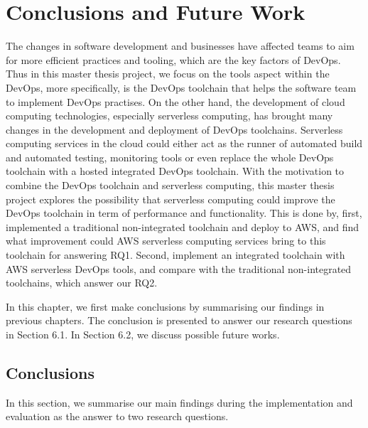 \chapter{Conclusions and Future Work}
\label{chp:conclusionsandfuturework}
The changes in software development and businesses have affected teams to aim for more efficient practices and tooling, which are the key factors of DevOps. Thus in this master thesis project, we focus on the tools aspect within the DevOps, more specifically, is the DevOps toolchain that helps the software team to implement DevOps practises. On the other hand, the development of cloud computing technologies, especially serverless computing, has brought many changes in the development and deployment of DevOps toolchains. Serverless computing services in the cloud could either act as the runner of automated build and automated testing, monitoring tools or even replace the whole DevOps toolchain with a hosted integrated DevOps toolchain. With the motivation to combine the DevOps toolchain and serverless computing, this master thesis project explores the possibility that serverless computing could improve the DevOps toolchain in term of performance and functionality. 
This is done by, first, implemented a traditional non-integrated toolchain and deploy to AWS, and find what improvement could AWS serverless computing services bring to this toolchain for answering RQ1. Second, implement an integrated toolchain with AWS serverless DevOps tools, and compare with the traditional non-integrated toolchains, which answer our RQ2. 
\par
In this chapter, we first make conclusions by summarising our findings in previous chapters. The conclusion is presented to answer our research questions in Section 6.1. In Section 6.2, we discuss possible future works.
\section{Conclusions}
In this section, we summarise our main findings during the implementation and evaluation as the answer to two research questions.

